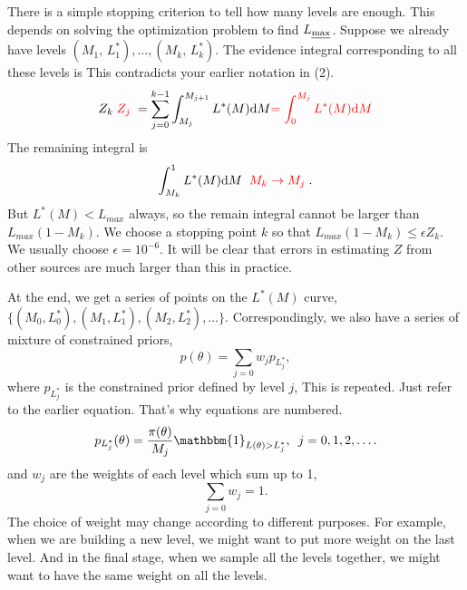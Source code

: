 \documentclass[letterpaper, preprint]{aastex}
\newcommand{\qer}[1]{{\color{red}#1}}
\begin{document}
There is a simple stopping criterion to tell how many levels are enough. 
\qer{This depends on solving the optimization problem to find $L_{\mbox{\scriptsize \em max}}$.}
Suppose we already have levels $\left(M_1,\,L^*_1\right), \ldots, \left(M_k,\,L^*_k\right)$. The evidence integral corresponding to all these levels is 
\qer{This contradicts your earlier notation in (2).}
$$
Z_k \qer{\; Z_j \;}= \sum_{j=0}^{k-1} \int_{M_j}^{M_{j+1}} L^*(M)\mathrm{d}M 
\qer{= \int_0^{M_{j}} L^*(M)\mathrm{d}M }
$$
The remaining integral is
$$
\int_{M_k}^1 L^*(M) \mathrm{d}M \qer{\;\; M_k \to M_j} \; .
$$
But $L^*(M) < L_{max}$ always, so the remain integral cannot be larger than $L_{max}(1-M_k)$. We choose a stopping point $k$ so that $L_{max}(1-M_k) \leq \epsilon Z_k$. We usually choose $\epsilon = 10^{-6}$.
\qer{It will be clear that errors in estimating $Z$ from other sources are much larger than this
in practice.}

At the end, we get a series of points on the $L^*(M)$ curve, $\{(M_0, L_0^*),(M_1,L_1^*),(M_2,L_2^*), \ldots\}$. Correspondingly, we also have a series of mixture of constrained priors,
\begin{equation}
p(\theta) = \sum_{j=0} w_j p_{L_j^*},
\label{eq:mixture-constrained-prior}
\end{equation}
where $p_{L_j^*}$ is the constrained prior defined by level $j$, \qer{This is repeated.  
Just refer to the earlier equation.  That's why equations are numbered.}
\begin{equation} 
p_{L_j^*}(\theta) = \frac{\pi(\theta)}{M_j}\mathbbm{1}_{L(\theta)>L_j^*},\,\,\,j=0,1,2,\ldots.
\end{equation}
and $w_j$ are the weights of each level which sum up to 1,
\begin{equation}
\sum_{j=0}w_j = 1.
\end{equation}
The choice of weight may change according to different purposes. For example, when we are building a new level, we might want to put more weight on the last level. And in the final stage, when we sample all the levels together, we might want to have the same weight on all the levels.
\end{document}
